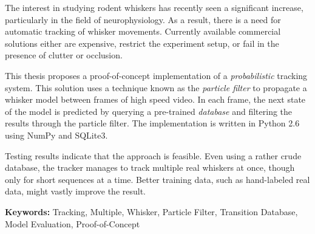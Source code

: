 The interest in studying rodent whiskers has recently seen a
significant increase, particularly in the field of neurophysiology. As
a result, there is a need for automatic tracking of whisker
movements. Currently available commercial solutions either are
expensive, restrict the experiment setup, or fail in the presence of
clutter or occlusion.

This thesis proposes a proof-of-concept implementation of a
\emph{probabilistic} tracking system.  This solution uses a technique
known as the \emph{particle filter} to propagate a whisker model
between frames of high speed video.  In each frame, the next state of
the model is predicted by querying a pre-trained \emph{database} and
filtering the results through the particle filter. The implementation
is written in Python 2.6 using NumPy and SQLite3.

Testing results indicate that the approach is feasible. Even using a
rather crude database, the tracker manages to track multiple real
whiskers at once, though only for short sequences at a time. Better
training data, such as hand-labeled real data, might vastly improve
the result.

\textbf{Keywords:} Tracking, Multiple, Whisker, Particle Filter,
Transition Database, Model Evaluation, Proof-of-Concept

